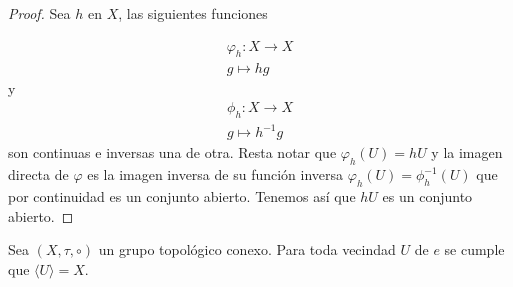 \begin{proof}
Sea $h$ en $X$, las siguientes funciones

\begin{align*}
\varphi_h:X \to X \\
g \mapsto hg
\end{align*}
y 
\begin{align*}
\phi_h:X \to X \\
g \mapsto h^{-1}g
\end{align*}
 son continuas e inversas una de otra. Resta notar que $\varphi_h(U)=hU$ y  la imagen directa de $\varphi$ es la imagen inversa de su función inversa  $\varphi_h(U)=\phi_h^{-1}(U)$ que por continuidad es un conjunto abierto.  Tenemos así que $hU$ es un conjunto abierto.

\end{proof}

\begin{pr} \label{pr:vec_de_la_id_gen}
Sea $(X, \tau, \circ)$ un grupo topológico conexo. Para toda vecindad $U$ de $e$ se cumple que $\langle U\rangle=X.$
\end{pr}
	
